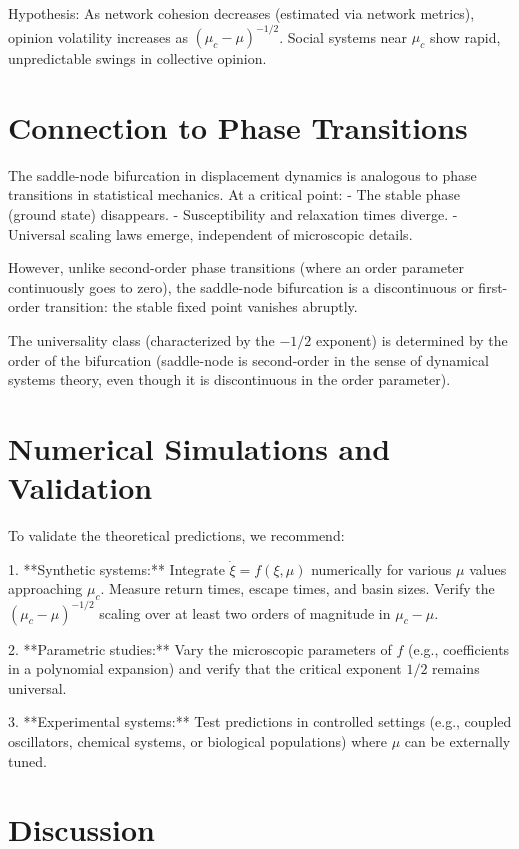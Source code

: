 \documentclass[12pt]{article}
\begin{document}
Hypothesis: As network cohesion decreases (estimated via network metrics), opinion volatility increases as $(\mu_c - \mu)^{-1/2}$. Social systems near $\mu_c$ show rapid, unpredictable swings in collective opinion.

\section{Connection to Phase Transitions}

The saddle-node bifurcation in displacement dynamics is analogous to phase transitions in statistical mechanics. At a critical point:
- The stable phase (ground state) disappears.
- Susceptibility and relaxation times diverge.
- Universal scaling laws emerge, independent of microscopic details.

However, unlike second-order phase transitions (where an order parameter continuously goes to zero), the saddle-node bifurcation is a discontinuous or first-order transition: the stable fixed point vanishes abruptly.

The universality class (characterized by the $-1/2$ exponent) is determined by the order of the bifurcation (saddle-node is second-order in the sense of dynamical systems theory, even though it is discontinuous in the order parameter).

\section{Numerical Simulations and Validation}

To validate the theoretical predictions, we recommend:

1. **Synthetic systems:** Integrate $\dot{\xi} = f(\xi, \mu)$ numerically for various $\mu$ values approaching $\mu_c$. Measure return times, escape times, and basin sizes. Verify the $(\mu_c - \mu)^{-1/2}$ scaling over at least two orders of magnitude in $\mu_c - \mu$.

2. **Parametric studies:** Vary the microscopic parameters of $f$ (e.g., coefficients in a polynomial expansion) and verify that the critical exponent $1/2$ remains universal.

3. **Experimental systems:** Test predictions in controlled settings (e.g., coupled oscillators, chemical systems, or biological populations) where $\mu$ can be externally tuned.

\section{Discussion}
\end{document}
